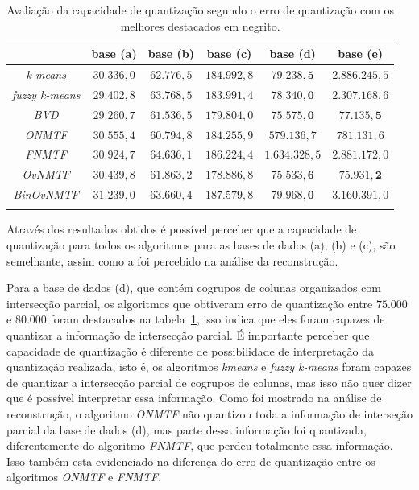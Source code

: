 \documentclass[
    12pt,                %
    oneside,            %
    a4paper,            %
    english,            %
    brazil                %
    ]{abntex2ppgsi}
\begin{document}
\begin{table}[H]
\centering
    \caption{Avaliação da capacidade de quantização segundo o erro de quantização com os melhores destacados em negrito.}
        \begin{tabular}{cccccc}
            \hline
            & \textbf{base (a)} & \textbf{base (b)} & \textbf{base (c)} & \textbf{base (d)} & \textbf{base (e)} \\
            \hline
            \textit{k-means}        & $30.336,0$ & $62.776,5$ & $184.992,8$ & $\mathbf{79.238,5}$  & $2.886.245,5$        \\
            \hline
            \textit{fuzzy k-means}  & $29.402,8$ & $63.768,5$ & $183.991,4$ & $\mathbf{78.340,0}$  & $2.307.168,6$        \\
            \hline
            \textit{BVD}            & $29.260,7$ & $61.536,5$ & $179.804,0$ & $\mathbf{75.575,0}$  & $\mathbf{77.135,5}$  \\
            \hline
            \textit{ONMTF}          & $30.555,4$ & $60.794,8$ & $184.255,9$ & $579.136,7$          & $781.131,6$          \\
            \hline
            \textit{FNMTF}          & $30.924,7$ & $64.636,1$ & $186.224,4$ & $1.634.328,5$        & $2.881.172,0$        \\
            \hline
            \textit{OvNMTF}         & $30.439,8$ & $61.863,2$ & $178.886,8$ & $\mathbf{75.533,6}$  & $\mathbf{75.931,2}$  \\
            \hline
            \textit{BinOvNMTF}      & $31.239,0$ & $63.660,4$ & $187.579,8$ & $\mathbf{79.968,0}$  & $3.160.391,0$        \\
            \hline \\
        \end{tabular}
        \label{tab:quantization}
\end{table}

Através dos resultados obtidos é possível perceber que a capacidade de quantização para todos os algoritmos para as bases de dados (a), (b) e (c), são semelhante, assim como a foi percebido na análise da reconstrução.

Para a base de dados (d), que contém cogrupos de colunas organizados com intersecção parcial, os algoritmos que obtiveram erro de quantização entre $75.000$ e $80.000$ foram destacados na tabela~\ref{tab:quantization}, isso indica que eles foram capazes de quantizar a informação de intersecção parcial.
É importante perceber que capacidade de quantização é diferente de possibilidade de interpretação da quantização realizada, isto é, os algoritmos \textit{kmeans} e \textit{fuzzy k-means} foram capazes de quantizar a intersecção parcial de cogrupos de colunas, mas isso não quer dizer que é possível interpretar essa informação.
Como foi mostrado na análise de reconstrução, o algoritmo \textit{ONMTF} não quantizou toda a informação de interseção parcial da base de dados (d), mas parte dessa informação foi quantizada, diferentemente do algoritmo \textit{FNMTF}, que perdeu totalmente essa informação.
Isso também esta evidenciado na diferença do erro de quantização entre os algoritmos \textit{ONMTF} e \textit{FNMTF}.
\end{document}
